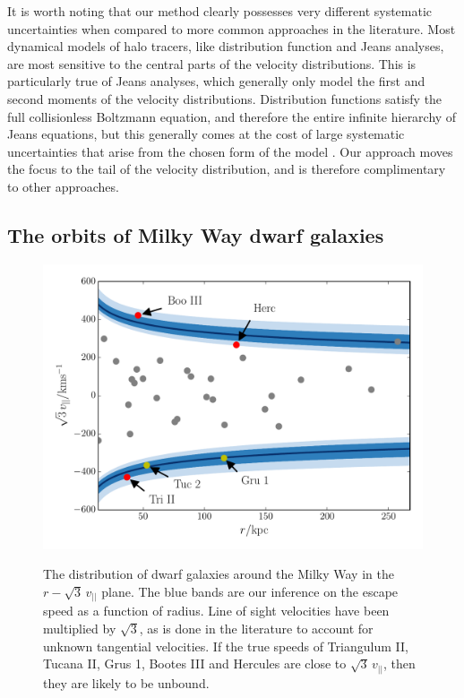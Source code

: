 \documentclass[useAMS,twocolumn,usenatbib]{mn2e}
\def\vlos{{v_{||}}}
\begin{document}
It is worth noting that our method clearly possesses very different systematic uncertainties when compared to more common approaches in the literature.
Most dynamical models of halo tracers, like distribution function and Jeans analyses, are most sensitive to the central parts of the velocity distributions.
This is particularly true of Jeans analyses, which generally only model the first and second moments of the velocity distributions. 
Distribution functions satisfy the full collisionless Boltzmann equation, and therefore the entire infinite hierarchy of Jeans equations, but this generally comes at the cost of large systematic uncertainties that arise from the chosen form of the model \citep{Wa15}.  
Our approach moves the focus to the tail of the velocity distribution, and is therefore complimentary to other approaches.

\subsection{The orbits of Milky Way dwarf galaxies}

\begin{figure}
\includegraphics[width=\columnwidth]{plots/sats}\\ 
\caption{The distribution of dwarf galaxies around the Milky Way in the $r-\sqrt{3}\,\vlos$ plane. 
The blue bands are our inference on the escape speed as a function of radius. 
Line of sight velocities have been multiplied by $\sqrt{3}$, as is done in the literature to account for unknown tangential velocities. 
If the true speeds of Triangulum II, Tucana II, Grus 1, Bootes III and Hercules are close to $\sqrt{3}\,\vlos$, then they are likely to be unbound.}
\label{fig:sats}
\end{figure}
\end{document}

